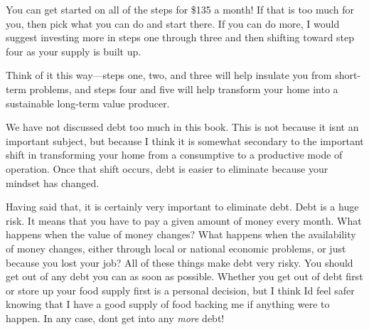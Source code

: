You can get started on all of the steps for \$135 a
month! If that is too
much for you, then pick what you can do and start there. If you can do
more, I would suggest investing more in steps one through three and
then shifting toward step four as your supply is built up.

Think of it this way—steps one, two, and three will help insulate you
from short-term problems, and steps four and five will help transform
your home into a sustainable long-term value producer.

\begin{infonote}

We have not discussed debt too much in this book. This is not because it
isn{\textquotesingle}t an important subject, but because I think it is
somewhat secondary to the important shift in transforming your home
from a consumptive to a productive mode of operation. Once that shift
occurs, debt is easier to eliminate because your mindset has changed. 

Having said that, it is certainly very important to eliminate debt. Debt
is a huge risk. It means that you have to pay a given amount of money
every month. What happens when the value of money changes?  What
happens when the availability of money changes, either through local or
national economic problems, or just because you lost your job?  All of
these things make debt very risky. You should get out of any debt you
can as soon as possible. Whether you get out of debt first or store up
your food supply first is a personal decision, but I think
I{\textquotesingle}d feel safer knowing that I have a good supply of
food backing me if anything were to happen. In any case,
don{\textquotesingle}t get into any \textit{more} debt!

\end{infonote}

